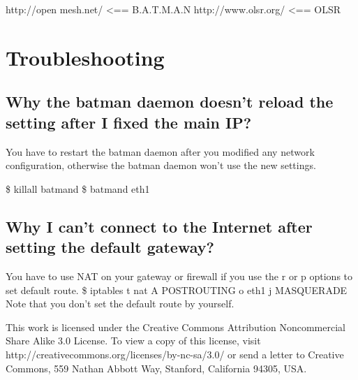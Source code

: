 \documentclass[
	12pt,
	a4paper,
	twoside,
	english,
	headsepline,
	footnosepline,
	automark,
	normalheadings,
	openany,
	cleardoubleplain,
	abstracton,
	idxtotoc,
	liststotoc,
	bibtotoc,
 	BCOR8mm,
]{scrartcl}
\begin{document}
http://open mesh.net/ <== B.A.T.M.A.N http://www.olsr.org/ <== OLSR 

\section{Troubleshooting}
\subsection{Why the batman daemon doesn't reload the setting after I fixed the main IP?}
You have to restart the batman daemon after you modified any network configuration,  otherwise the batman daemon won't use the new settings.

\$ killall batmand   \$ batmand eth1

\subsection{Why I can't connect to the Internet after setting the default gateway?}
You have to use NAT on your gateway or firewall if you use the  r or  p options to set default  route. \$ iptables  t nat  A POSTROUTING  o eth1  j MASQUERADE Note that you don't set the default route by yourself.

This work is licensed under the Creative Commons Attribution Noncommercial Share Alike 3.0 License. To 
view a copy of this license, visit http://creativecommons.org/licenses/by-nc-sa/3.0/ or send a letter to Creative  Commons, 559 Nathan Abbott Way, Stanford, California 94305, USA.
\end{document}
